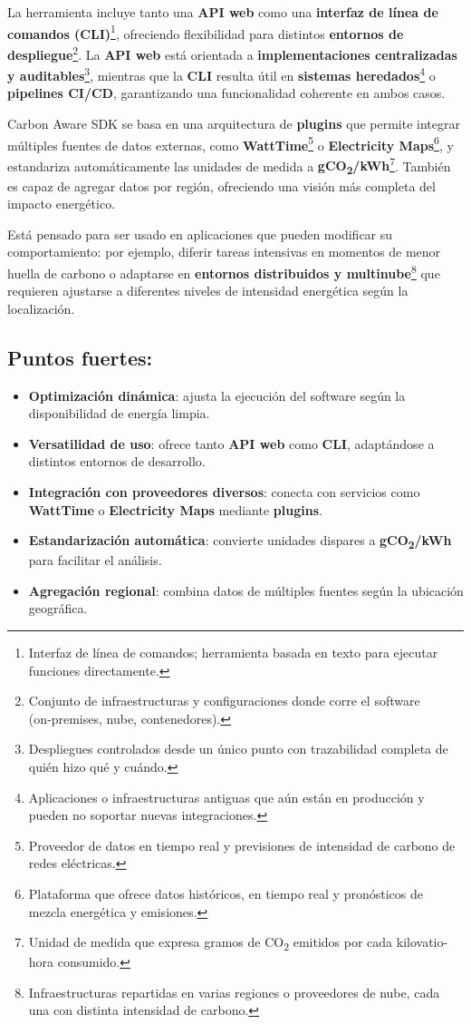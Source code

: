 \documentclass[12pt,a4paper]{report}
\begin{document}
La herramienta incluye tanto una \textbf{API web} como una \textbf{interfaz de línea de comandos
  (CLI)}\footnote{Interfaz de línea de comandos; herramienta basada en texto para
  ejecutar funciones directamente.}, ofreciendo flexibilidad para distintos
\textbf{entornos de despliegue}\footnote{Conjunto de infraestructuras y
  configuraciones donde corre el software (on‑premises, nube, contenedores).}. La
\textbf{API web} está orientada a
\textbf{implementaciones centralizadas y auditables}\footnote{Despliegues
  controlados desde un único punto con trazabilidad completa de quién hizo qué y
  cuándo.}, mientras que la \textbf{CLI} resulta útil
en \textbf{sistemas heredados}\footnote{Aplicaciones o infraestructuras
  antiguas que aún están en producción y pueden no soportar nuevas
  integraciones.} o \textbf{pipelines CI/CD}, garantizando una funcionalidad coherente en ambos casos.

Carbon Aware SDK se basa en una arquitectura de
\textbf{plugins} que permite integrar múltiples fuentes
de datos externas, como \textbf{WattTime}\footnote{Proveedor de datos en tiempo
  real y previsiones de intensidad de carbono de redes eléctricas.} o
\textbf{Electricity Maps}\footnote{Plataforma que ofrece datos históricos, en
  tiempo real y pronósticos de mezcla energética y emisiones.}, y estandariza
automáticamente las unidades de medida a
\textbf{gCO\textsubscript{2}/kWh}\footnote{Unidad de medida que expresa gramos
  de CO\textsubscript{2} emitidos por cada kilovatio-hora consumido.}. También es
capaz de agregar datos por región, ofreciendo una visión más completa del
impacto energético.

Está pensado para ser usado en aplicaciones que pueden modificar su
comportamiento: por ejemplo, diferir tareas intensivas en momentos de menor
huella de carbono o adaptarse en \textbf{entornos distribuidos y
  multinube}\footnote{Infraestructuras repartidas en varias regiones o
  proveedores de nube, cada una con distinta intensidad de carbono.} que
requieren ajustarse a diferentes niveles de intensidad energética según la
localización.

\subsection*{Puntos fuertes:}

\begin{itemize}
  \item \textbf{Optimización dinámica}: ajusta la ejecución del software según la disponibilidad de energía limpia.
  \item \textbf{Versatilidad de uso}: ofrece tanto \textbf{API web} como \textbf{CLI}, adaptándose a distintos entornos de desarrollo.
  \item \textbf{Integración con proveedores diversos}: conecta con servicios como \textbf{WattTime} o \textbf{Electricity Maps} mediante \textbf{plugins}.
  \item \textbf{Estandarización automática}: convierte unidades dispares a \textbf{gCO\textsubscript{2}/kWh} para facilitar el análisis.
  \item \textbf{Agregación regional}: combina datos de múltiples fuentes según la ubicación geográfica.
\end{itemize}
\end{document}

